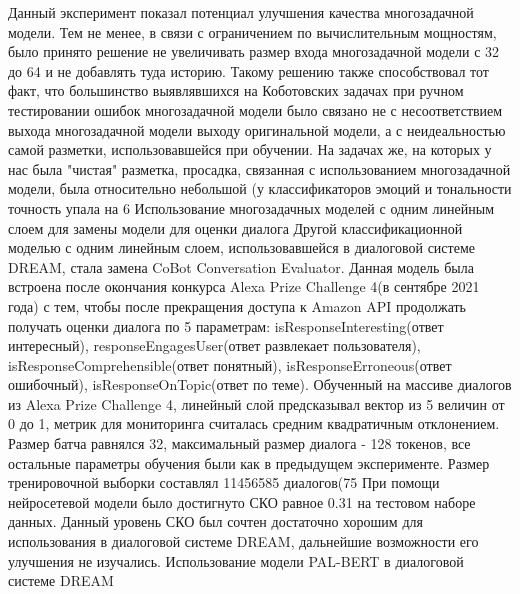 Данный эксперимент показал потенциал улучшения качества многозадачной модели. Тем не менее, в связи с ограничением по вычислительным мощностям, было принято решение не увеличивать размер входа многозадачной модели с 32 до 64 и не добавлять туда историю. Такому решению также способствовал тот факт, что большинство выявлявшихся на Коботовских задачах при ручном тестировании ошибок многозадачной модели  было связано не с несоответствием выхода многозадачной модели выходу оригинальной модели, а с неидеальностью самой разметки, использовавшейся при обучении. 
На задачах же, на которых у нас была "чистая" разметка, просадка, связанная с использованием многозадачной модели, была относительно небольшой (у классификаторов эмоций и тональности точность упала на 6%
Использование многозадачных моделей с одним линейным слоем для замены модели для оценки диалога
Другой классификационной моделью с одним линейным слоем, использовавшейся в диалоговой системе DREAM, стала замена CoBot Conversation Evaluator. Данная модель была встроена после окончания конкурса Alexa Prize Challenge 4(в сентябре 2021 года) с тем, чтобы после прекращения доступа к Amazon API продолжать получать оценки диалога по 5 параметрам: isResponseInteresting(ответ интересный), responseEngagesUser(ответ развлекает пользователя), isResponseComprehensible(ответ понятный), isResponseErroneous(ответ ошибочный), isResponseOnTopic(ответ по теме). Обученный на массиве диалогов из Alexa Prize Challenge 4, линейный слой предсказывал вектор из 5 величин от 0 до 1, метрик для мониторинга считалась средним квадратичным отклонением. 
Размер батча равнялся 32, максимальный размер диалога - 128 токенов, все остальные параметры обучения были как в предыдущем эксперименте. Размер тренировочной выборки составлял 11456585 диалогов(75%
При помощи нейросетевой модели было достигнуто СКО равное 0.31 на тестовом наборе данных. Данный уровень СКО был сочтен достаточно хорошим для использования в диалоговой системе DREAM, дальнейшие возможности его улучшения не изучались.
Использование модели PAL-BERT в диалоговой системе DREAM 

